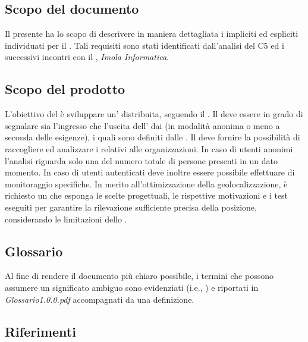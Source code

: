 \documentclass[../analisi-dei-requisiti.tex]{subfiles}
\begin{document}
\subsection{Scopo del documento}%
\label{sub:scopo_del_documento}
Il presente  ha lo scopo di descrivere in maniera dettagliata i  impliciti ed espliciti individuati per il . Tali requisiti sono stati identificati dall'analisi del  C5 ed i successivi incontri con il , \textit{Imola Informatica}.

\subsection{Scopo del prodotto}%
\label{sub:scopo_del_prodotto}
L'obiettivo del  è sviluppare un' distribuita, seguendo il .
Il  deve essere in grado di segnalare sia l'ingresso che l'uscita dell' dai  (in modalità anonima o meno a seconda delle esigenze), i quali sono definiti dalle .
Il  deve fornire la possibilità di raccogliere ed analizzare i  relativi alle organizzazioni.
In caso di utenti anonimi l'analisi riguarda solo una  del numero totale di persone presenti in un dato momento.
In caso di utenti autenticati deve inoltre essere possibile effettuare  di monitoraggio specifiche.
In merito all'ottimizzazione della geolocalizzazione, è richiesto un  che esponga le scelte progettuali, le rispettive motivazioni e i test eseguiti per garantire la rilevazione sufficiente precisa della posizione, considerando le limitazioni dello .


\subsection{Glossario}%
\label{sub:glossario}
Al fine di rendere il documento più chiaro possibile, i termini che possono assumere un significato ambiguo sono evidenziati (i.e., ) e riportati in \textit{Glossario1.0.0.pdf} accompagnati da una definizione.

\subsection{Riferimenti}%
\label{sub:riferimenti}
\end{document}

